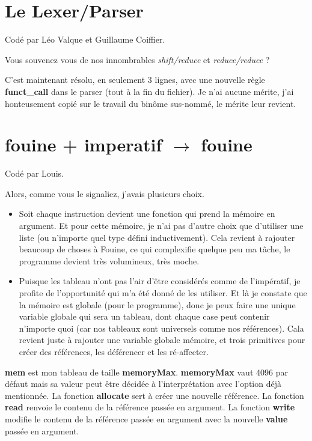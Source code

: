 \documentclass[a4paper,10pt]{report}
\begin{document}
\section{Le Lexer/Parser}  
Codé par Léo Valque et Guillaume Coiffier.  
  
Vous souvenez vous de nos innombrables \textit{shift/reduce} et \textit{reduce/reduce} ?  
  
C'est maintenant résolu, en seulement 3 lignes, avec une nouvelle règle \textbf{funct\_{}call} dans le parser (tout à la fin du fichier). Je n'ai aucune mérite, j'ai honteusement copié sur le travail du binôme sus-nommé, le mérite leur revient.  

\newpage
  
\section{fouine + imperatif $\rightarrow$ fouine}  
Codé par Louis.  
  
Alors, comme vous le signaliez, j'avais plusieurs choix.  

\begin{itemize}
\item Soit chaque instruction devient une fonction qui prend la mémoire en argument. Et pour cette mémoire, je n'ai pas d'autre choix que d'utiliser une liste (ou n'importe quel type défini inductivement). Cela revient à rajouter beaucoup de choses à Fouine, ce qui complexifie quelque peu ma tâche, le programme devient très volumineux, très moche. 
\item Puisque les tableau n'ont pas l'air d'être considérés comme de l'impératif, je profite de l'opportunité qui m'a été donné de les utiliser. Et là je constate que la mémoire est globale (pour le programme), donc je peux faire une unique variable globale qui sera un tableau, dont chaque case peut contenir n'importe quoi (car nos tableaux sont universels comme nos références). Cala revient juste à rajouter une variable globale mémoire, et trois primitives pour créer des références, les déférencer et les ré-affecter.  
\end{itemize}

\textbf{mem} est mon tableau de taille \textbf{memoryMax}. \textbf{memoryMax} vaut 4096 par défaut mais sa valeur peut être décidée à l'interprétation avec l'option déjà mentionnée. La fonction \textbf{allocate} sert à créer une nouvelle référence. La fonction \textbf{read} renvoie le contenu de la référence passée en argument. La fonction \textbf{write} modifie le contenu de la référence passée en argument avec la nouvelle \textbf{value} passée en argument.
  
\end{document}
